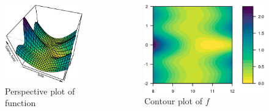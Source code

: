 \documentclass[aspectratio=1610,onlytextwidth]{beamer}
\begin{document}
\begin{frame}[c]
  \begin{columns}
    \begin{column}{0.4\textwidth}
      \begin{figure}[htpb]
        \centering
        \includegraphics[]{images/nonlinear-persp.pdf}
        \caption{%
          Perspective plot of function
        }
      \end{figure}
    \end{column}
    \pause
    \begin{column}{0.5\textwidth}
      \begin{figure}[htpb]
        \centering
        \includegraphics[]{images/nonlinear-contour.png}
        \caption{%
          Contour plot of \(f\)
        }
      \end{figure}
    \end{column}
  \end{columns}
\end{frame}
\end{document}
